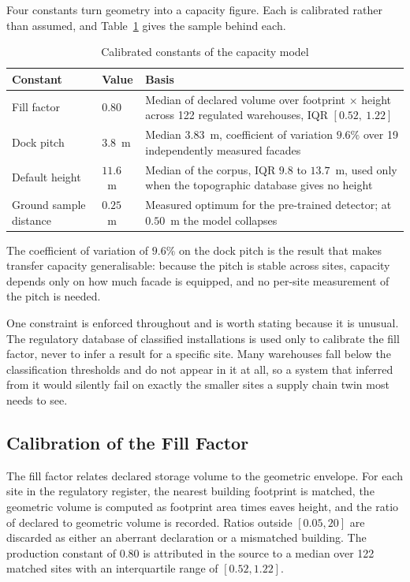 Four constants turn geometry into a capacity figure. Each is calibrated rather than assumed,
and Table~\ref{tab:volume_constants} gives the sample behind each.

\begin{table}[htbp]
\centering
\caption{Calibrated constants of the capacity model}
\label{tab:volume_constants}
\small
\begin{tabularx}{\linewidth}{>{\raggedright\arraybackslash}p{3.4cm} >{\centering\arraybackslash}p{2.0cm} X}
\toprule
\textbf{Constant} & \textbf{Value} & \textbf{Basis} \\
\midrule
Fill factor & $0.80$ & Median of declared volume over footprint $\times$ height across 122
regulated warehouses, IQR $[0.52,\ 1.22]$ \\
Dock pitch & $3.8$~m & Median $3.83$~m, coefficient of variation $9.6\%$ over 19
independently measured facades \\
Default height & $11.6$~m & Median of the corpus, IQR $9.8$ to $13.7$~m, used only when the
topographic database gives no height \\
Ground sample distance & $0.25$~m & Measured optimum for the pre-trained detector; at
$0.50$~m the model collapses \\
\bottomrule
\end{tabularx}
\end{table}

The coefficient of variation of $9.6\%$ on the dock pitch is the result that makes transfer
capacity generalisable: because the pitch is stable across sites, capacity depends only on
how much facade is equipped, and no per-site measurement of the pitch is needed.

One constraint is enforced throughout and is worth stating because it is unusual. The
regulatory database of classified installations is used only to calibrate the fill factor,
never to infer a result for a specific site. Many warehouses fall below the classification
thresholds and do not appear in it at all, so a system that inferred from it would silently
fail on exactly the smaller sites a supply chain twin most needs to see.

\subsection*{Calibration of the Fill Factor}

The fill factor relates declared storage volume to the geometric envelope. For each site in
the regulatory register, the nearest building footprint is matched, the geometric volume is
computed as footprint area times eaves height, and the ratio of declared to geometric volume
is recorded. Ratios outside $[0.05, 20]$ are discarded as either an aberrant declaration or a
mismatched building. The production constant of $0.80$ is attributed in the source to a
median over 122 matched sites with an interquartile range of $[0.52, 1.22]$.

